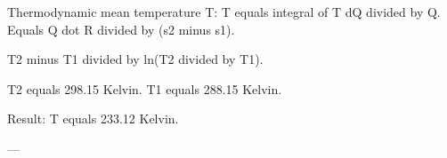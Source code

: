 Thermodynamic mean temperature T:  
T equals integral of T dQ divided by Q.  
Equals Q dot R divided by (s2 minus s1).  

T2 minus T1 divided by ln(T2 divided by T1).  

T2 equals 298.15 Kelvin.  
T1 equals 288.15 Kelvin.  

Result:  
T equals 233.12 Kelvin.  

---